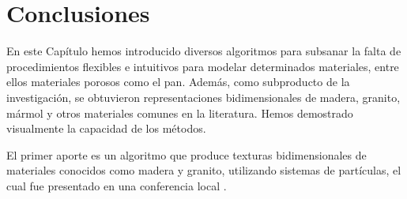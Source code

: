 







\section{Conclusiones}
En este Cap\'itulo hemos introducido diversos algoritmos para subsanar la falta de procedimientos flexibles e intuitivos para modelar determinados materiales, entre ellos materiales porosos como el pan. Además, como subproducto de la investigación, se obtuvieron representaciones bidimensionales de madera, granito, mármol y otros materiales comunes en la literatura.
Hemos demostrado visualmente la capacidad de los métodos.

El primer aporte es un algoritmo que produce texturas bidimensionales de materiales conocidos como madera y granito, utilizando sistemas de partículas, el cual fue presentado en una conferencia local \cite{Baravalle2011}.

